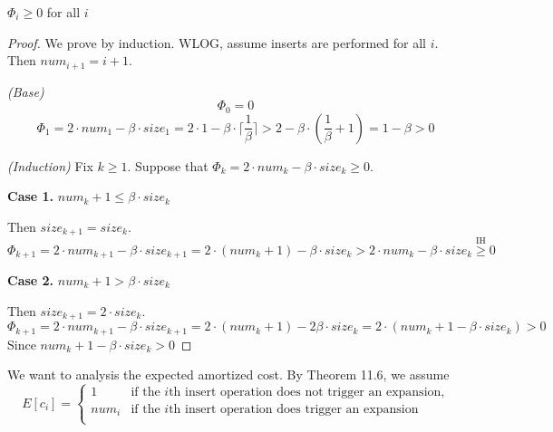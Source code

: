 \begin{claim}
    $\Phi_i \geq 0$ for all $i$
\end{claim}

\begin{proof}
    We prove by induction.
    WLOG, assume inserts are performed for all $i$.
    Then $num_{i+1} = i + 1$.

    \textit{(Base)}
    \begin{equation*}
        \Phi_0 = 0
    \end{equation*}
    \begin{equation*}
        \Phi_1 = 2 \cdot num_1 - \beta \cdot size_1
        = 2 \cdot 1 - \beta \cdot \lceil \frac{1}{\beta} \rceil
        > 2 - \beta \cdot (\frac{1}{\beta} + 1)
        = 1 - \beta > 0
    \end{equation*}

    \textit{(Induction)}
    Fix $k \geq 1$.
    Suppose that $\Phi_k = 2 \cdot num_k - \beta \cdot size_k \geq 0$.
    
    \textbf{Case 1.}
    $num_k + 1 \leq \beta \cdot size_k$

    Then $size_{k+1} = size_k$.
    \begin{equation*}
        \Phi_{k+1} = 2 \cdot num_{k+1} - \beta \cdot size_{k+1} 
        = 2 \cdot (num_k + 1) - \beta \cdot size_k 
        > 2 \cdot num_k - \beta \cdot size_k \overset{\text{IH}}{\geq} 0
    \end{equation*}
    
    \textbf{Case 2.}
    $num_k + 1 > \beta \cdot size_k$
    
    Then $size_{k+1} = 2 \cdot size_k$.
    \begin{equation*}
        \Phi_{k+1} = 2 \cdot num_{k+1} - \beta \cdot size_{k+1} 
        = 2 \cdot (num_k + 1) - 2 \beta \cdot size_k
        = 2 \cdot (num_k + 1 - \beta \cdot size_k)
        > 0
    \end{equation*}
    Since $num_k + 1 - \beta \cdot size_k > 0$
\end{proof}

We want to analysis the expected amortized cost.
By Theorem 11.6,
we assume
\begin{equation*}
    E[c_i] = 
    \begin{cases}
        1 & \text{if the $i$th insert operation does not trigger an expansion,} \\
        num_i & \text{if the $i$th insert operation does trigger an expansion} \\
    \end{cases}
\end{equation*}

